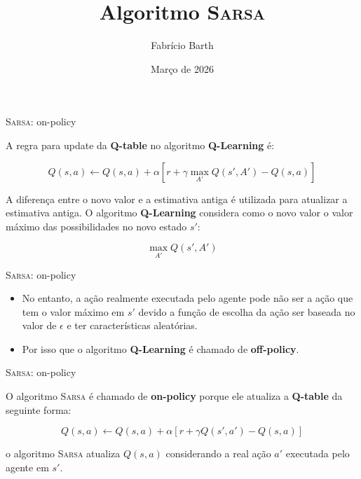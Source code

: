 \documentclass{beamer}
\begin{document}
\title{Algoritmo \textsc{Sarsa}} 
\author{Fabrício Barth}
\date{Março de 2026}

\maketitle

\begin{frame}{\textsc{Sarsa}: on-policy}
	
	A regra para update da \textbf{Q-table} no algoritmo \textbf{Q-Learning} é: 
	
	\begin{equation}
	Q(s,a) \leftarrow Q(s,a) + \alpha [r +\gamma \max_{A'}{Q(s', A')} - Q(s,a)]
	\end{equation}

	A diferença entre o novo valor e a estimativa antiga é utilizada para atualizar a estimativa antiga. O algoritmo \textbf{Q-Learning} considera como o novo valor o valor máximo das possibilidades no novo estado $s'$: 
	
	\begin{equation}
	\max_{A'}{Q(s', A')}
	\end{equation}
	
\end{frame}


\begin{frame}{\textsc{Sarsa}: on-policy}
	
	\begin{itemize}
		
	\item No entanto, a ação realmente executada pelo agente pode não ser a ação que tem o valor máximo em $s'$ devido a função de escolha da ação ser baseada no valor de $\epsilon$ e ter características aleatórias.
	
	\item Por isso que o algoritmo \textbf{Q-Learning} é chamado de \textbf{off-policy}.   
\end{itemize}
	
\end{frame}


\begin{frame}{\textsc{Sarsa}: on-policy}
	
	O algoritmo \textsc{Sarsa} é chamado de  \textbf{on-policy} porque ele atualiza a \textbf{Q-table} da seguinte forma: 
	
	\begin{equation}
		Q(s,a) \leftarrow Q(s,a) + \alpha [r +\gamma Q(s', a') - Q(s,a)]
	\end{equation}
	
	o algoritmo \textsc{Sarsa} atualiza $Q(s,a)$ considerando a real ação $a'$ executada pelo agente em $s'$.
	
\end{frame}
\end{document}
